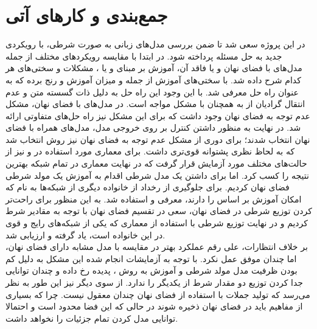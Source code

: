 \chapter{جمع‌بندی و کار‌های آتی}\label{Chap:Chap6}
\minitoc

در این پروژه سعی شد تا ضمن بررسی مدل‌های زبانی به صورت شرطی، با رویکردی جدید به حل مسئله پرداخته شود. در ابتدا با مقایسه رویکرد‌های مختلف از جمله مدل‌های با فضای نهان و یا فاقد آن، آموزش بر مبنای \maxlikelihood{} و یا \gan{}، مشکلات و سختی‌های هر کدام شرح داده شد. \gan{} با سختی‌های آموزش از جمله \modecollapse{} و میزان آموزش \discriminator{} و \generator{} رنج برده که به عنوان راه حل \wgan{} معرفی شد. با این وجود این راه حل به دلیل ذات گسسته متن و عدم انتقال گرادیان از \discriminator{} به \generator{} همچنان با مشکل مواجه است. در مدل‌های با فضای نهان، مشکل عدم توجه به فضای نهان وجود داشت که برای این مشکل نیز راه حل‌های متفاوتی ارائه شد. در نهایت به منظور داشتن کنترل بر روی خروجی مدل، مدل‌های همراه با فضای نهان انتخاب شدند؛ برای دوری از مشکل عدم توجه به فضای نهان نیز روش \wae{} انتخاب شد که به لحاظ نظری پشتوانه قوی‌تری داشت. برای معماری مورد استفاده در \encoder{} و \decoder{} نیز از حالت‌های مختلف مورد آزمایش قرار گرفت که در نهایت معماری \transformer{} در تمام شبکه بهترین نتیجه را کسب کرد. اما برای داشتن یک مدل شرطی اقدام به آموزش یک مولد شرطی فضای نهان کردیم. برای جلوگیری از رخداد \modecollapse{} از خانواده دیگری از شبکه‌ها به نام \normalizingflownets{} که امکان آموزش بر اساس \maxlikelihood{} را دارند، معرفی و استفاده شد. به این منظور برای راحت‌تر کردن توزیع شرطی در فضای نهان، سعی در تقسیم فضای نهان با توجه به مقادیر شرط کردیم و در نهایت توزیع شرطی با استفاده از معماری  که یکی از شبکه‌های رایج و قوی در این خانواده است، یاد گرفته و ارزیابی شد.
\\
بر خلاف انتظارات، علی رقم عملکرد بهتر در مقایسه با مدل مشابه دارای فضای نهان، اما چندان موفق عمل نکرد. با توجه به آزمایشات انجام شده  این مشکل به دلیل کم بودن ظرفیت مدل مولد شرطی و آموزش به روش \maxlikelihood{}، پدیده \meanseeking{} رخ داده و چندان توانایی جدا کردن توزیع دو مقدار شرط از یکدیگر را ندارد. از سوی دیگر نیز این طور به نظر می‌رسد که تولید جملات با استفاده از فضای نهان چندان معقول نیست. چرا که بسیاری از مفاهیم باید در فضای نهان ذخیره شوند در حالی که این فضا محدود است و احتمالا توانایی مدل کردن تمام جزئیات را نخواهد داشت.